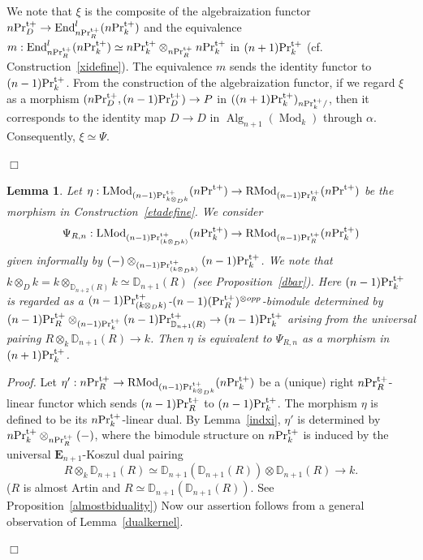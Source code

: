 \documentclass[leqno,12pt]{amsart}
\theoremstyle{plain}
\newtheorem{Lemma}[Theorem]{Lemma}
\theoremstyle{definition}
\newcommand{\DD}{\mathbb{D}}
\newcommand{\PRTT}{\textup{Pr}^{\textup{t}+}}
\newcommand{\Mod}{\operatorname{Mod}}
\newcommand{\Alg}{\operatorname{Alg}}
\newcommand{\End}{\operatorname{End}}
\newcommand{\LMod}{\operatorname{LMod}}
\newcommand{\RMod}{\operatorname{RMod}}
\newcommand{\Proof}{{\sl Proof.}\quad}
\newcommand{\QED}{{\unskip\nobreak\hfil\penalty50\quad\null\nobreak\hfil
{$\Box$}\parfillskip0pt\finalhyphendemerits0\par\medskip}}
\begin{document}
We note that $\xi$ is the composite of 
the algebraization functor $n\PRTT_D\to \End_{n\PRTT_R}^l(n\PRTT_k)$
and the equivalence $m:\End_{n\PRTT_R}^l(n\PRTT_k)\simeq n\PRTT_k\otimes_{n\PRTT_R}n\PRTT_k$
in $(n+1)\PRTT_k$  (cf. Construction~\ref{xidefine}).
The equivalence $m$ sends the identity functor to $(n-1)\PRTT_k$.
From the construction of the algebraization functor, if we regard $\xi$ as a morphism 
$(n\PRTT_D,(n-1)\PRTT_D)\to P$ in $((n+1)\PRTT_k)_{n\PRTT_k/}$,
then it corresponds to the identity map $D\to D$ in $\Alg_{n+1}(\Mod_k)$ through $\alpha$.
Consequently, $\xi\simeq \Psi$.
\QED



\begin{Lemma}
\label{indeta}
Let
$\eta:\LMod_{(n-1)\PRTT_{k\otimes_{D}k}}(n\PRTT) \to \RMod_{(n-1)\PRTT_R}(n\PRTT) $
be the morphism in Construction~\ref{etadefine}.
We consider 
\[
\Psi_{R,n}:\LMod_{(n-1)\PRTT_{(k\otimes_Dk)}}(n\PRTT_k)  \to \RMod_{(n-1)\PRTT_{R}}(n\PRTT_k)
\]
given informally by $(-)\otimes_{(n-1)\PRTT_{(k\otimes_Dk)}}(n-1)\PRTT_k$.
We note that $k\otimes_{D}k= k\otimes_{\DD_{n+2}(R)}k\simeq \DD_{n+1}(R)$ (see Proposition~\ref{dbar}).
Here $(n-1)\PRTT_k$
is regarded as a $(n-1)\PRTT_{(k\otimes_Dk)}$-$(n-1)(\PRTT_{R})^{\otimes opp}$-bimodule determined by
 $(n-1)\PRTT_{R}\otimes_{(n-1)\PRTT_k}(n-1)\PRTT_{\DD_{n+1}(R)}\to (n-1)\PRTT_k$ arising from the universal pairing $R\otimes_k\DD_{n+1}(R)\to k$.
Then $\eta$ is equivalent to $\Psi_{R,n}$ as a morphism in $(n+1)\PRTT_k$.
\end{Lemma}


\Proof
Let $\eta':n\PRTT_R\to \RMod_{(n-1)\PRTT_{k\otimes_Dk}}(n\PRTT_k)$
be a (unique) right $n\PRTT_R$-linear functor
which sends $(n-1)\PRTT_R$ to $(n-1)\PRTT_k$.
The morphism $\eta$ is defined to be its $n\PRTT_k$-linear dual.
By Lemma~\ref{indxi}, $\eta'$
is determined by $n\PRTT_k\otimes_{n\PRTT_R}(-)$,
where the bimodule structure on $n\PRTT_k$
is induced by the universal $\mathbf{E}_{n+1}$-Koszul dual pairing 
\[
 R\otimes_k\DD_{n+1}(R)\simeq \DD_{n+1}(\DD_{n+1}(R))\otimes \DD_{n+1}(R)\to k.
\]
($R$ is almost Artin and $R\simeq \DD_{n+1}(\DD_{n+1}(R))$. See Proposition~\ref{almostbiduality})
Now our assertion follows from a general observation of Lemma~\ref{dualkernel}.
\QED
\end{document}
